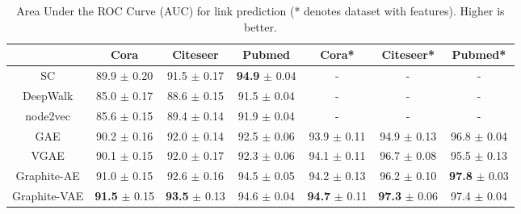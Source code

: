 \documentclass{article}
\newcommand{\name}{Graphite}
\begin{document}
\begin{table*}[t]
  \caption{Area Under the ROC Curve (AUC) for link prediction (* denotes dataset with features). Higher is better.
  }
  \label{table-auc}
   \vspace{0.05in}
  \centering
  \begin{tabular}{|c|c|c|c|c|c|c|}
    \toprule
	& Cora &  Citeseer & Pubmed & Cora* & Citeseer* & Pubmed* \\
    \midrule
    SC & 89.9 $\pm$ 0.20 & 91.5 $\pm$ 0.17& \textbf{94.9} $\pm$ 0.04 & - & - & -\\
    DeepWalk & 85.0 $\pm$ 0.17& 88.6 $\pm$ 0.15& 91.5 $\pm$ 0.04& - & - & -\\
    node2vec & 85.6 $\pm$ 0.15& 89.4 $\pm$ 0.14& 91.9 $\pm$ 0.04 & - & - & -\\
    GAE & 90.2 $\pm$ 0.16& 92.0 $\pm$ 0.14& 92.5 $\pm$ 0.06& 93.9 $\pm$ 0.11& 94.9 $\pm$ 0.13& 96.8 $\pm$ 0.04\\
    VGAE & 90.1 $\pm$ 0.15& 92.0 $\pm$ 0.17& 92.3 $\pm$ 0.06 & 94.1 $\pm$ 0.11& 96.7 $\pm$ 0.08& 95.5 $\pm$ 0.13\\
    \midrule
    \name{}-AE & 91.0 $\pm$ 0.15 & 92.6 $\pm$ 0.16& 94.5 $\pm$ 0.05& 94.2 $\pm$ 0.13& 96.2 $\pm$ 0.10& \textbf{97.8} $\pm$ 0.03 \\
    \name-VAE & \textbf{91.5} $\pm$ 0.15 & \textbf{93.5} $\pm$ 0.13 & 94.6 $\pm$ 0.04& \textbf{94.7} $\pm$ 0.11 & \textbf{97.3} $\pm$ 0.06 & 97.4 $\pm$ 0.04\\
    \bottomrule
  \end{tabular}
\end{table*}
\end{document}

